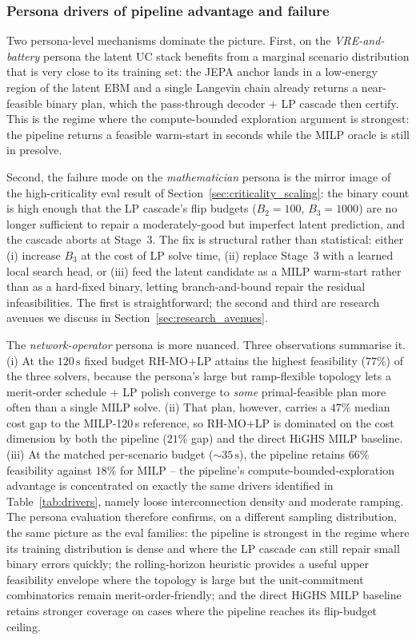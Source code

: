 \documentclass{article}
\begin{document}
\subsubsection{Persona drivers of pipeline advantage and failure}
\label{sec:persona_drivers}

Two persona-level mechanisms dominate the picture. First, on the \emph{VRE-and-battery} persona the latent UC stack benefits from a marginal scenario distribution that is very close to its training set: the JEPA anchor lands in a low-energy region of the latent EBM and a single Langevin chain already returns a near-feasible binary plan, which the pass-through decoder + LP cascade then certify. This is the regime where the compute-bounded exploration argument is strongest: the pipeline returns a feasible warm-start in seconds while the MILP oracle is still in presolve.

Second, the failure mode on the \emph{mathematician} persona is the mirror image of the high-criticality eval result of Section~\ref{sec:criticality_scaling}: the binary count is high enough that the LP cascade's flip budgets ($B_2 = 100$, $B_3 = 1000$) are no longer sufficient to repair a moderately-good but imperfect latent prediction, and the cascade aborts at Stage~3. The fix is structural rather than statistical: either (i) increase $B_3$ at the cost of LP solve time, (ii) replace Stage~3 with a learned local search head, or (iii) feed the latent candidate as a MILP warm-start rather than as a hard-fixed binary, letting branch-and-bound repair the residual infeasibilities. The first is straightforward; the second and third are research avenues we discuss in Section~\ref{sec:research_avenues}.

The \emph{network-operator} persona is more nuanced. Three observations summarise it. (i) At the $120\,\mathrm{s}$ fixed budget RH-MO+LP attains the highest feasibility ($77\%$) of the three solvers, because the persona's large but ramp-flexible topology lets a merit-order schedule + LP polish converge to \emph{some} primal-feasible plan more often than a single MILP solve. (ii) That plan, however, carries a $47\%$ median cost gap to the MILP-120\,s reference, so RH-MO+LP is dominated on the cost dimension by both the pipeline ($21\%$ gap) and the direct HiGHS MILP baseline. (iii) At the matched per-scenario budget ($\sim 35\,\mathrm{s}$), the pipeline retains $66\%$ feasibility against $18\%$ for MILP -- the pipeline's compute-bounded-exploration advantage is concentrated on exactly the same drivers identified in Table~\ref{tab:drivers}, namely loose interconnection density and moderate ramping. The persona evaluation therefore confirms, on a different sampling distribution, the same picture as the eval families: the pipeline is strongest in the regime where its training distribution is dense and where the LP cascade can still repair small binary errors quickly; the rolling-horizon heuristic provides a useful upper feasibility envelope where the topology is large but the unit-commitment combinatorics remain merit-order-friendly; and the direct HiGHS MILP baseline retains stronger coverage on cases where the pipeline reaches its flip-budget ceiling.
\end{document}

